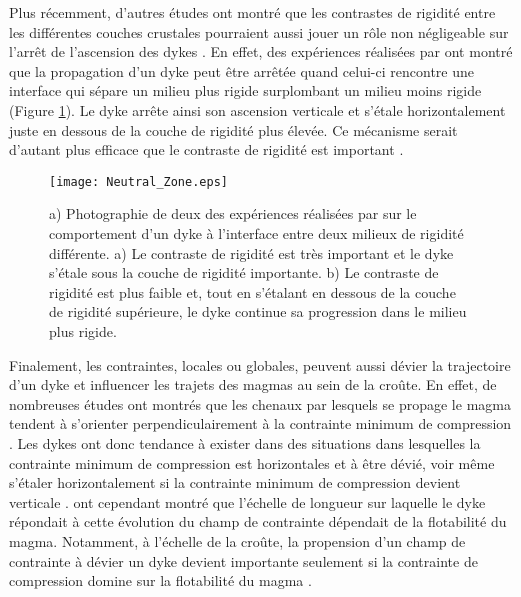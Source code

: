 Plus  récemment, d'autres  études  ont montré  que  les contrastes  de
rigidité  entre les  différentes  couches  crustales pourraient  aussi
jouer un  rôle non  négligeable sur l'arrêt  de l'ascension  des dykes
\citep{Menand:2011ki}.   En  effet,   des  expériences  réalisées  par
\citet{Kavanagh:2006ig} ont  montré que la propagation  d'un dyke peut
être  arrêtée quand  celui-ci rencontre  une interface  qui sépare  un
milieu  plus  rigide  surplombant   un  milieu  moins  rigide  (Figure
\ref{C1-Neutral_Zone}). Le  dyke arrête ainsi son  ascension verticale
et s'étale horizontalement  juste en dessous de la  couche de rigidité
plus  élevée.   Ce mécanisme  serait  d'autant  plus efficace  que  le
contraste de rigidité est important \citep{Kavanagh:2006ig}.

\begin{figure}[htpb]
  \begin{center}
    \graphicspath{ {/Users/thorey/Documents/These/Manuscript/Figure/Chapter1/} }
    \texttt{[image: Neutral\_Zone.eps]}
    \caption{a)  Photographie de  deux des  expériences réalisées  par
      \citet{Kavanagh:2006ig}   sur  le   comportement  d'un   dyke  à
      l'interface entre  deux milieux  de rigidité différente.   a) Le
      contraste de rigidité est très important et le dyke s'étale sous
      la couche de  rigidité importante.  b) Le  contraste de rigidité
      est plus faible et, tout en s'étalant en dessous de la couche de
      rigidité  supérieure, le  dyke continue  sa progression  dans le
      milieu plus rigide.}
    \label{C1-Neutral_Zone}
  \end{center}
\end{figure}


Finalement, les contraintes, locales ou globales, peuvent aussi dévier
la trajectoire d'un dyke et influencer  les trajets des magmas au sein
de la  croûte.  En  effet, de  nombreuses études  ont montrés  que les
chenaux  par  lesquels  se  propage  le  magma  tendent  à  s'orienter
perpendiculairement   à   la   contrainte   minimum   de   compression
\citep{Anderson:L5JA3dNN,Watanabe:2002iw}. Les dykes ont donc tendance
à exister dans des situations dans lesquelles la contrainte minimum de
compression  est horizontales  et  à être  dévié,  voir même  s'étaler
horizontalement  si  la  contrainte  minimum  de  compression  devient
verticale
\citep{Pinel:2000wa,Pinel:2004ji,Maccaferri:2014ft}. \citet{Menand:2010uq}
ont cependant  montré que l'échelle  de longueur sur laquelle  le dyke
répondait à  cette évolution  du champ de  contrainte dépendait  de la
flotabilité  du  magma.   Notamment,  à l'échelle  de  la  croûte,  la
propension  d'un  champ  de  contrainte   à  dévier  un  dyke  devient
importante seulement  si la  contrainte de  compression domine  sur la
flotabilité du magma \citep{Menand:2010uq}.

